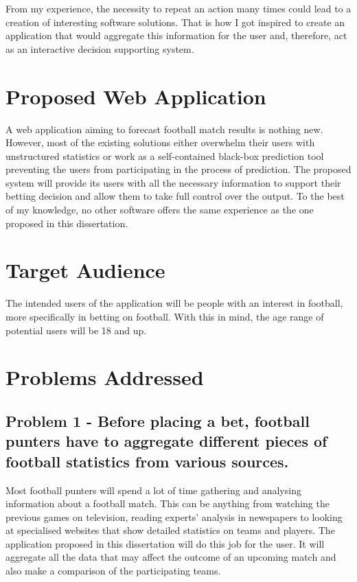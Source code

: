 From my experience, the necessity to repeat an action many times could lead to a creation of interesting software solutions. That is how I got inspired to create an application that would aggregate this information for the user and, therefore, act as an interactive decision supporting system.

\section{Proposed Web Application}
\label{sec:proposedwebapp_intro}
A web application aiming to forecast football match results is nothing new. However, most of the existing solutions either overwhelm their users with unstructured statistics or work as a self-contained black-box prediction tool preventing the users from participating in the process of prediction. The proposed system will provide its users with all the necessary information to support their betting decision and allow them to take full control over the output. To the best of my knowledge, no other software offers the same experience as the one proposed in this dissertation.

\section{Target Audience}
\label{sec:targetaudience_intro}
The intended users of the application will be people with an interest in football, more specifically in betting on football. With this in mind, the age range of potential users will be 18 and up.

\section{Problems Addressed}
\label{sec:problemsaddressed_intro}

\subsection*{Problem 1 - Before placing a bet, football punters have to aggregate different pieces of football statistics from various sources.}
Most football punters will spend a lot of time gathering and analysing information about a football match. This can be anything from watching the previous games on television, reading experts' analysis in newspapers to looking at specialised websites that show detailed statistics on teams and players. The application proposed in this dissertation will do this job for the user. It will aggregate all the data that may affect the outcome of an upcoming match and also make a comparison of the participating teams.

